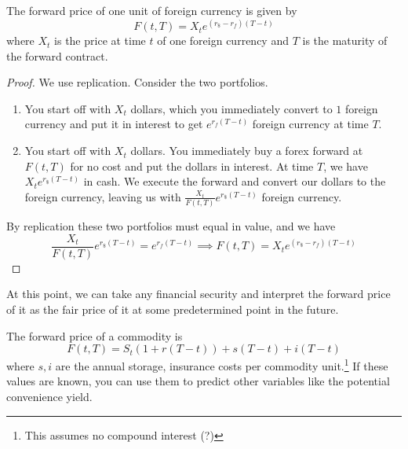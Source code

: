 \documentclass{article}
\begin{document}
    \begin{theorem}
      \label{thm:forward-price-of-forex}
      The forward price of one unit of foreign currency is given by 
      \begin{equation}
        F(t, T) = X_t e^{(r_{\$} - r_f) (T - t)}
      \end{equation}
      where $X_t$ is the price at time $t$ of one foreign currency and $T$ is the maturity of the forward contract. 
    \end{theorem}
    \begin{proof}
      We use replication. Consider the two portfolios. 
      \begin{enumerate}
        \item You start off with $X_t$ dollars, which you immediately convert to $1$ foreign currency and put it in interest to get $e^{r_f (T - t)}$ foreign currency at time $T$. 
        \item You start off with $X_t$ dollars. You immediately buy a forex forward at $F(t, T)$ for no cost and put the dollars in interest. At time $T$, we have $X_t e^{r_{\$} (T - t)}$ in cash. We execute the forward and convert our dollars to the foreign currency, leaving us with $\frac{X_t}{F(t, T)} e^{r_{\$} (T - t)}$ foreign currency. 
      \end{enumerate}
      By replication these two portfolios must equal in value, and we have 
      \begin{equation}
        \frac{X_t}{F(t, T)} e^{r_{\$} (T - t)} = e^{r_f (T - t)} \implies F(t, T) = X_t e^{(r_{\$} - r_f) (T - t)}
      \end{equation}
    \end{proof}

    At this point, we can take any financial security and interpret the forward price of it as the fair price of it at some predetermined point in the future. 

    \begin{example}
      \label{ex:forward-price-of-commodities}
      The forward price of a commodity is 
      \begin{equation}
        F(t, T) = S_t (1 + r (T - t)) + s (T - t) + i (T - t)
      \end{equation}
      where $s, i$ are the annual storage, insurance costs per commodity unit.\footnote{This assumes no compound interest (?) } If these values are known, you can use them to predict other variables like the potential convenience yield. 
    \end{example}
\end{document}
